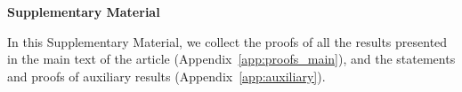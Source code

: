 \documentclass[11pt,twoside]{article} %
\begin{document}
\clearpage
\begin{center}

{\bf{\LARGE{Supplementary Material}}}
\end{center}

\appendix

In this Supplementary Material, we collect the proofs of all the results presented in the main text of the article (Appendix~\ref{app:proofs_main}), and the statements and proofs of auxiliary results (Appendix~\ref{app:auxiliary}).



%
%
%
%

%
%
\end{document}
